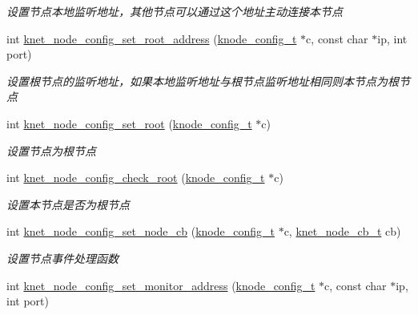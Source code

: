 \begin{DoxyCompactItemize}
\begin{DoxyCompactList}\small\item\em 设置节点本地监听地址，其他节点可以通过这个地址主动连接本节点 \end{DoxyCompactList}\item 
int \hyperlink{a00106_a25f80200a2d66822bd506d96c67f968a_a25f80200a2d66822bd506d96c67f968a}{knet\+\_\+node\+\_\+config\+\_\+set\+\_\+root\+\_\+address} (\hyperlink{a00066_af1cfaee0eb1c76ebf06076b95cc47ee1_af1cfaee0eb1c76ebf06076b95cc47ee1}{knode\+\_\+config\+\_\+t} $\ast$c, const char $\ast$ip, int port)
\begin{DoxyCompactList}\small\item\em 设置根节点的监听地址，如果本地监听地址与根节点监听地址相同则本节点为根节点 \end{DoxyCompactList}\item 
int \hyperlink{a00106_a19e111bf3ecf6b1ef52b6374303ee5d2_a19e111bf3ecf6b1ef52b6374303ee5d2}{knet\+\_\+node\+\_\+config\+\_\+set\+\_\+root} (\hyperlink{a00066_af1cfaee0eb1c76ebf06076b95cc47ee1_af1cfaee0eb1c76ebf06076b95cc47ee1}{knode\+\_\+config\+\_\+t} $\ast$c)
\begin{DoxyCompactList}\small\item\em 设置节点为根节点 \end{DoxyCompactList}\item 
int \hyperlink{a00106_ae58212789e9236f88a4522a657699654_ae58212789e9236f88a4522a657699654}{knet\+\_\+node\+\_\+config\+\_\+check\+\_\+root} (\hyperlink{a00066_af1cfaee0eb1c76ebf06076b95cc47ee1_af1cfaee0eb1c76ebf06076b95cc47ee1}{knode\+\_\+config\+\_\+t} $\ast$c)
\begin{DoxyCompactList}\small\item\em 设置本节点是否为根节点 \end{DoxyCompactList}\item 
int \hyperlink{a00106_a2c910b387bed0b4ccb59701476c24c8d_a2c910b387bed0b4ccb59701476c24c8d}{knet\+\_\+node\+\_\+config\+\_\+set\+\_\+node\+\_\+cb} (\hyperlink{a00066_af1cfaee0eb1c76ebf06076b95cc47ee1_af1cfaee0eb1c76ebf06076b95cc47ee1}{knode\+\_\+config\+\_\+t} $\ast$c, \hyperlink{a00066_a09c2d1f8eef7dc82226691ce39b7c4d8_a09c2d1f8eef7dc82226691ce39b7c4d8}{knet\+\_\+node\+\_\+cb\+\_\+t} cb)
\begin{DoxyCompactList}\small\item\em 设置节点事件处理函数 \end{DoxyCompactList}\item 
int \hyperlink{a00106_a5e9e62b115f085ba01f865bde785a7fa_a5e9e62b115f085ba01f865bde785a7fa}{knet\+\_\+node\+\_\+config\+\_\+set\+\_\+monitor\+\_\+address} (\hyperlink{a00066_af1cfaee0eb1c76ebf06076b95cc47ee1_af1cfaee0eb1c76ebf06076b95cc47ee1}{knode\+\_\+config\+\_\+t} $\ast$c, const char $\ast$ip, int port)

\end{DoxyCompactItemize}
